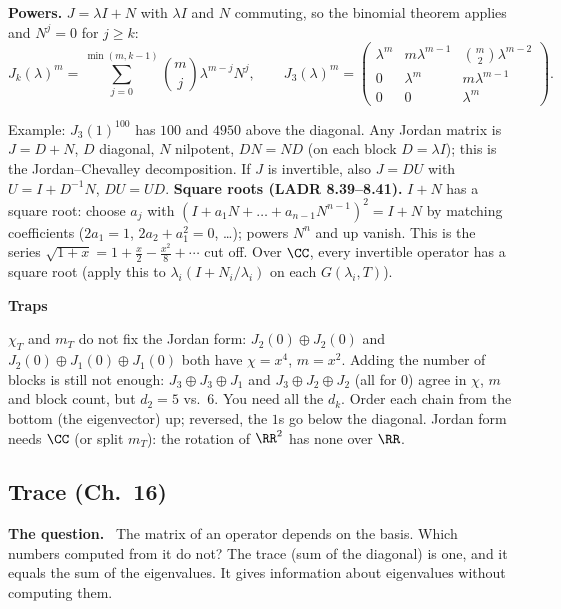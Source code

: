 \documentclass[10pt]{scrartcl}
\newenvironment{qbox}{\begin{mdframed}[style=qboxstyle]\textbf{The question.}\ }{\end{mdframed}}
\newenvironment{trapbox}{\begin{mdframed}[style=trapstyle]\textbf{\color{RawSienna}Traps}\begin{itemize}[itemsep=1pt,topsep=1pt]}{\end{itemize}\end{mdframed}}
\begin{document}
\textbf{Powers.} $J=\lambda I+N$ with $\lambda I$ and $N$ commuting, so the binomial theorem applies and $N^j=0$ for $j\ge k$:
\[ J_k(\lambda)^m=\sum_{j=0}^{\min(m,k-1)}\binom mj\lambda^{m-j}N^j,\qquad J_3(\lambda)^m=\begin{pmatrix}\lambda^m&m\lambda^{m-1}&\binom m2\lambda^{m-2}\\0&\lambda^m&m\lambda^{m-1}\\0&0&\lambda^m\end{pmatrix}. \]
\begin{itemize}
  \ii Example: $J_3(1)^{100}$ has $100$ and $4950$ above the diagonal.
  \ii Any Jordan matrix is $J=D+N$, $D$ diagonal, $N$ nilpotent, $DN=ND$ (on each block $D=\lambda I$); this is the Jordan--Chevalley decomposition. If $J$ is invertible, also $J=DU$ with $U=I+D^{-1}N$, $DU=UD$.
  \ii \textbf{Square roots (LADR 8.39--8.41).} $I+N$ has a square root: choose $a_j$ with $(I+a_1N+\dots+a_{n-1}N^{n-1})^2=I+N$ by matching coefficients ($2a_1=1$, $2a_2+a_1^2=0$, \dots); powers $N^n$ and up vanish. This is the series $\sqrt{1+x}=1+\frac x2-\frac{x^2}8+\cdots$ cut off. Over $\CC$, every invertible operator has a square root (apply this to $\lambda_i(I+N_i/\lambda_i)$ on each $G(\lambda_i,T)$).
\end{itemize}

\begin{trapbox}
  \ii $\chi_T$ and $m_T$ do not fix the Jordan form: $J_2(0)\oplus J_2(0)$ and $J_2(0)\oplus J_1(0)\oplus J_1(0)$ both have $\chi=x^4$, $m=x^2$.
  \ii Adding the number of blocks is still not enough: $J_3\oplus J_3\oplus J_1$ and $J_3\oplus J_2\oplus J_2$ (all for $0$) agree in $\chi$, $m$ and block count, but $d_2=5$ vs.\ $6$. You need all the $d_k$.
  \ii Order each chain from the bottom (the eigenvector) up; reversed, the $1$s go below the diagonal.
  \ii Jordan form needs $\CC$ (or split $m_T$): the rotation of $\RR^2$ has none over $\RR$.
\end{trapbox}

\subsection{Trace (Ch.~16)}

\begin{qbox}
  The matrix of an operator depends on the basis. Which numbers computed from it do not? The trace (sum of the diagonal) is one, and it equals the sum of the eigenvalues. It gives information about eigenvalues without computing them.
\end{qbox}
\end{document}
